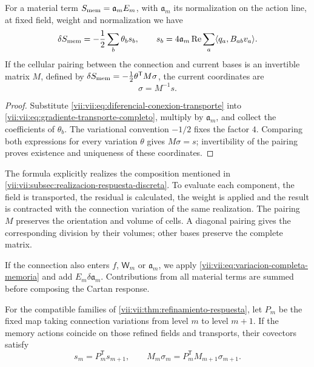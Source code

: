 \begin{theorem}
\label{vii:vii:thm:corriente-conexion-evaluada}
For a material term \(S_{\rm mem}=\mathfrak a_m E_m\),
with \(\mathfrak a_m\) its normalization on the action line,
at fixed field, weight and normalization we have
\begin{equation}
 \delta S_{\rm mem}=-\frac12\sum_b\theta_b s_b,\qquad
 s_b=4\mathfrak a_m\operatorname{Re}
        \sum_a\langle q_a,B_{ab}v_a\rangle.
 \label{vii:vii:eq:componentes-corriente-conexion}
\end{equation}
If the cellular pairing between the connection and current bases
is an invertible matrix \(M\), defined by
\(\delta S_{\rm mem}=-\tfrac12\theta^{\mathsf T}M\sigma\),
the current coordinates are
\begin{equation}
 \sigma=M^{-1}s.
 \label{vii:vii:eq:coordenadas-corriente-material}
\end{equation}
\end{theorem}

\begin{proof}
Substitute \eqref{vii:vii:eq:diferencial-conexion-transporte} into
\eqref{vii:vii:eq:gradiente-transporte-completo}, multiply by
\(\mathfrak a_m\), and collect the coefficients of
\(\theta_b\). The variational convention \(-1/2\) fixes the
factor \(4\). Comparing both expressions for every variation
\(\theta\) gives \(M\sigma=s\); invertibility of the pairing
proves existence and uniqueness of these coordinates.
\end{proof}

The formula explicitly realizes the composition mentioned in
\ref{vii:vii:subsec:realizacion-respuesta-discreta}. To evaluate each
component, the field is transported, the residual is calculated, the
weight is applied and the result is contracted with the connection variation of the same realization.
The pairing \(M\) preserves the orientation and volume of cells.
A diagonal pairing gives the corresponding division by their
volumes; other bases preserve the complete matrix.

If the connection also enters \(f\), \(\mathsf W_m\)
or \(\mathfrak a_m\), we apply
\eqref{vii:vii:eq:variacion-completa-memoria} and add
\(E_m\delta\mathfrak a_m\). Contributions from all
material terms are summed before composing the Cartan response.

\begin{corollary}
\label{vii:vii:cor:refinamiento-corriente-conexion}
For the compatible families of
\ref{vii:vii:thm:refinamiento-respuesta}, let \(P_m\) be the fixed map
taking connection variations from level \(m\) to level
\(m+1\). If the memory actions coincide on those refined fields
and transports, their covectors satisfy
\[
 s_m=P_m^{\mathsf T}s_{m+1},\qquad
 M_m\sigma_m=P_m^{\mathsf T}M_{m+1}\sigma_{m+1}.
\]
\end{corollary}

